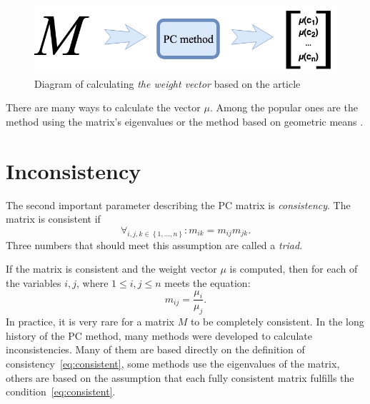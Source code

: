 \begin{figure}[ht]
\label{fig:fig1}
\centerline{\includegraphics[scale=2.5]{fig1.png}}
\caption{Diagram of calculating \textit{the weight vector} based on the article \cite{Kulakowski2014}}
\end{figure}

There are many ways to calculate the vector $\mu$. Among the popular ones are the method using the matrix's eigenvalues or the method based on geometric means \cite{SAATY1998}.

\section{Inconsistency}
\label{subsec:inconsistency}
The second important parameter describing the PC matrix is \textit{consistency}. The matrix is consistent if 
	\begin{equation}
		\label{eq:consistent}
		\forall _{i,j,k \in\left\{ 1,\ldots,n\right\}} :m_{ik}=m_{ij}m_{jk}.
	\end{equation}
Three numbers that should meet this assumption are called a \textit{triad}.

If the matrix is consistent and the weight vector $\mu$ is computed, then for each of the variables $i,j$, where $1\leq i,j\leq n$ meets the equation: 
	\begin{equation} 
		\label{eq:consistent2}		
		m_{ij}=\frac{\mu_{i}}{\mu_{j}}.
 	\end{equation}
In practice, it is very rare for a matrix $M$ to be completely consistent. In the long history of the PC method, many methods were developed to calculate inconsistencies. Many of them are based directly on the definition of consistency~\ref{eq:consistent}, some methods use the eigenvalues of the matrix, others are based on the assumption that each fully consistent matrix fulfills the condition~\ref{eq:consistent}.